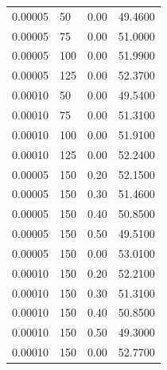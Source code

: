 \documentclass{article}
\begin{document}
\begin{center}
\begin{tabular}{|l|l|l|c|}
		0.00005 & 50 & 0.00 & 49.4600 \\
		0.00005 & 75 & 0.00 & 51.0000 \\
		0.00005 & 100 & 0.00 & 51.9900 \\
		0.00005 & 125 & 0.00 & 52.3700 \\
		0.00010 & 50 & 0.00 & 49.5400 \\
		0.00010 & 75 & 0.00 & 51.3100 \\
		0.00010 & 100 & 0.00 & 51.9100 \\
		0.00010 & 125 & 0.00 & 52.2400 \\
		0.00005 & 150 & 0.20 & 52.1500 \\
		0.00005 & 150 & 0.30 & 51.4600 \\
		0.00005 & 150 & 0.40 & 50.8500 \\
		0.00005 & 150 & 0.50 & 49.5100 \\
		0.00005 & 150 & 0.00 & 53.0100 \\
		0.00010 & 150 & 0.20 & 52.2100 \\
		0.00010 & 150 & 0.30 & 51.3100 \\
		0.00010 & 150 & 0.40 & 50.8500 \\
		0.00010 & 150 & 0.50 & 49.3000 \\
		0.00010 & 150 & 0.00 & 52.7700 \\\hline
	\end{tabular}
	\end{center}
\end{document}
